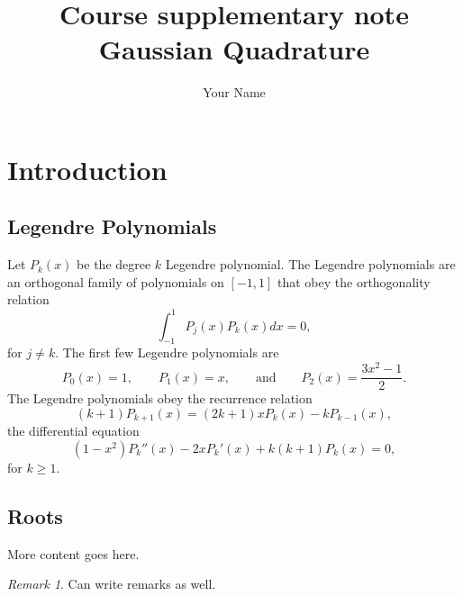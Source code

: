 \documentclass{amsart}
\title{Course supplementary note \\ Gaussian Quadrature}
\author{Your Name}
\theoremstyle{remark}
\newtheorem{remark}{Remark}
\begin{document}
\maketitle

\section{Introduction}
\subsection{Legendre Polynomials}
Let $P_k(x)$ be the degree $k$ Legendre polynomial. The Legendre polynomials
are an orthogonal family of polynomials on $[-1,1]$ that obey the orthogonality
relation
$$
\int_{-1}^1 P_j(x) P_k(x) dx = 0,
$$
for $j \not = k$. The first few Legendre polynomials are
$$
P_0(x) = 1, \qquad P_1(x) = x, \qquad \text{and} \qquad P_2(x) = \frac{3 x^2 - 1}{2}.  
$$
The Legendre polynomials obey the recurrence relation
$$
(k+1) P_{k+1}(x) = (2 k + 1) x P_k(x) - k P_{k-1}(x),
$$
the differential equation
$$
(1 - x^2) P_k''(x) - 2 x P_k'(x) + k(k+1) P_k(x) = 0,
$$
for $k \ge 1$.

\subsection{Roots} 
More content goes here.

\begin{remark}
Can write remarks as well.
\end{remark}
\end{document}
